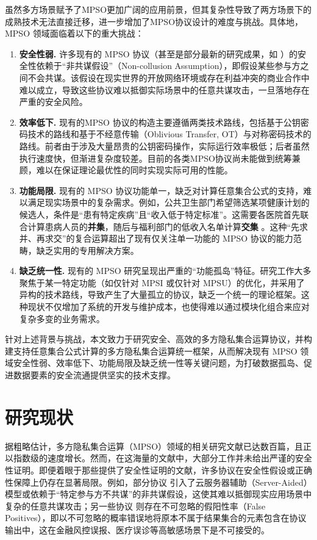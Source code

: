 虽然多方场景赋予了MPSO更加广阔的应用前景，但其复杂性导致了两方场景下的成熟技术无法直接迁移，进一步增加了MPSO协议设计的难度与挑战。具体地，MPSO 领域面临着以下的重大挑战：
\begin{enumerate}
	\item \textbf{安全性弱.} 许多现有的 MPSO 协议（甚至是部分最新的研究成果，如 \cite{LG-ASIACRYPT-2023,Zhang23c,GaoTY24,SC-abs-2309}）的安全性依赖于“非共谋假设”（Non-collusion Assumption），即假设某些参与方之间不会共谋。该假设在现实世界的开放网络环境或存在利益冲突的商业合作中难以成立，导致这些协议难以抵御实际场景中的任意共谋攻击，一旦落地存在严重的安全风险。

	\item \textbf{效率低下.} 现有的MPSO 协议的构造主要遵循两类技术路线，包括基于公钥密码技术的路线和基于不经意传输（Oblivious Transfer, OT）与对称密码技术的路线。前者由于涉及大量昂贵的公钥密码操作，实际运行效率极低；后者虽然执行速度快，但渐进复杂度较差。目前的各类MPSO协议尚未能做到统筹兼顾，难以在保证理论最优性的同时实现实际可用的性能。

    \item \textbf{功能局限.} 现有的 MPSO 协议功能单一，缺乏对计算任意集合公式的支持，难以满足现实场景中的复杂需求。例如，公共卫生部门希望筛选某项健康计划的候选人，条件是“患有特定疾病”且“收入低于特定标准”。这需要各医院首先联合计算患病人员的\textbf{并集}，随后与福利部门的低收入名单计算\textbf{交集} \cite{KS-CRYPTO-2005}。这种“先求并、再求交”的复合运算超出了现有仅关注单一功能的 MPSO 协议的能力范畴，缺乏实用的专用解决方案。
    
    \item \textbf{缺乏统一性.} 现有的 MPSO 研究呈现出严重的“功能孤岛”特征。研究工作大多聚焦于某一特定功能（如仅针对 MPSI 或仅针对 MPSU）的优化，并采用了异构的技术路线，导致产生了大量孤立的协议，缺乏一个统一的理论框架。这种现状不仅增加了系统的开发与维护成本，也使得难以通过模块化组合来应对复杂多变的业务需求。
\end{enumerate}

针对上述背景与挑战，本文致力于研究安全、高效的多方隐私集合运算协议，并构建支持任意集合公式计算的多方隐私集合运算统一框架，从而解决现有 MPSO 领域安全性弱、效率低下、功能局限及缺乏统一性等关键问题，为打破数据孤岛、促进数据要素的安全流通提供坚实的技术支撑。

\section{研究现状}

据粗略估计，多方隐私集合运算（MPSO）领域的相关研究文献已达数百篇，且正以指数级的速度增长。然而，在这海量的文献中，大部分工作并未给出严谨的安全性证明。即便着眼于那些提供了安全性证明的文献，许多协议在安全性假设或正确性保障上仍存在显著局限。例如，部分协议 \cite{LiW07,BA-ASIACCS-2012,SCK12,ChandranD0OSS21,LG-ASIACRYPT-2023,Zhang23c,GaoTY24,SC-abs-2309} 引入了云服务器辅助（Server-Aided）模型或依赖于“特定参与方不共谋”的非共谋假设，这使其难以抵御现实应用场景中复杂的任意共谋攻击；另一些协议 \cite{BayEHSV22,VCE22} 则存在不可忽略的假阳性率（False Positives），即以不可忽略的概率错误地将原本不属于结果集合的元素包含在协议输出中，这在金融风控误报、医疗误诊等高敏感场景下是不可接受的。

